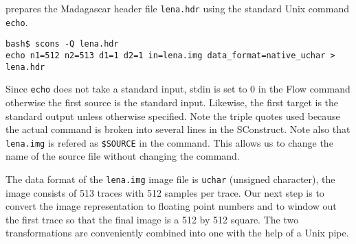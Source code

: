 
%
prepares the Madagascar header file \texttt{lena.hdr} using the
standard Unix command \texttt{echo}. 
%
\begin{verbatim}
bash$ scons -Q lena.hdr
echo n1=512 n2=513 d1=1 d2=1 in=lena.img data_format=native_uchar > lena.hdr
\end{verbatim}
%
Since \texttt{echo} does not take a standard input, stdin is set to 0
in the Flow command otherwise the first source is the standard input.
Likewise, the first target is the standard output unless otherwise
specified. Note the triple quotes used because the actual command is
broken into several lines in the SConstruct. Note also that
\texttt{lena.img} is refered as \texttt{\$SOURCE} in the command. This
allows us to change the name of the source file without changing the command.

The data format of the \texttt{lena.img} image file is \texttt{uchar}
(unsigned character), the image consists of 513 traces with 512
samples per trace.  Our next step is to convert the image
representation to floating point numbers and to window out the first
trace so that the final image is a 512 by 512 square. The two
transformations are conveniently combined into one with the help of a Unix pipe.

